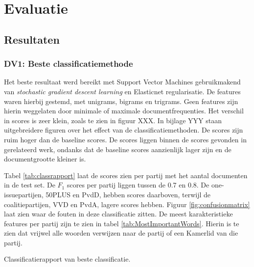 \section{Evaluatie}
\label{sec:eva}

\subsection{Resultaten}

\subsubsection{DV1: Beste classificatiemethode}
Het beste resultaat werd bereikt met Support Vector Machines gebruikmakend van \textit{stochastic gradient descent learning} en Elasticnet regularisatie. De features waren hierbij gestemd, met unigrams, bigrams en trigrams. Geen features zijn hierin weggelaten door minimale of maximale documentfrequenties. Het verschil in scores is zeer klein, zoals te zien in figuur XXX. In bijlage YYY staan uitgebreidere figuren over het effect van de classificatiemethoden. De scores zijn ruim hoger dan de baseline scores. De scores liggen binnen de scores gevonden in gerelateerd werk, ondanks dat de baseline scores aanzienlijk lager zijn en de documentgrootte kleiner is.\par
Tabel \ref{tab:classrapport} laat de scores zien per partij met het aantal documenten in de test set. De $F_1$ scores per partij liggen tussen de 0.7 en 0.8. De one-issuepartijen, 50PLUS en PvdD, hebben scores daarboven, terwijl de coalitiepartijen, VVD en PvdA, lagere scores hebben. Figuur \ref{fig:confusionmatrix} laat zien waar de fouten in deze classificatie zitten. De meest karakteristieke features per partij zijn te zien in tabel \ref{tab:MostImportantWords}. Hierin is te zien dat vrijwel alle woorden verwijzen naar de partij of een Kamerlid van die partij.\par

\begin{table}[H]
\caption{Classificatierapport van beste classificatie.}
\label{tab:classrapport}
\centering

\end{table}


